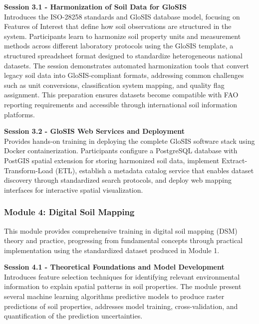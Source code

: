 \documentclass[
  10pt,
  b5paper,
  oneside]{book}
\begin{document}
\textbf{Session 3.1 - Harmonization of Soil Data for GloSIS}\\
Introduces the ISO-28258 standards and GloSIS database model, focusing on Features of Interest that define how soil observations are structured in the system. Participants learn to harmonize soil property units and measurement methods across different laboratory protocols using the GloSIS template, a structured spreadsheet format designed to standardize heterogeneous national datasets. The session demonstrates automated harmonization tools that convert legacy soil data into GloSIS-compliant formats, addressing common challenges such as unit conversions, classification system mapping, and quality flag assignment. This preparation ensures datasets become compatible with FAO reporting requirements and accessible through international soil information platforms.

\textbf{Session 3.2 - GloSIS Web Services and Deployment}\\
Provides hands-on training in deploying the complete GloSIS software stack using Docker containerization. Participants configure a PostgreSQL database with PostGIS spatial extension for storing harmonized soil data, implement Extract-Transform-Load (ETL), establish a metadata catalog service that enables dataset discovery through standardized search protocols, and deploy web mapping interfaces for interactive spatial visualization.

\subsubsection*{\texorpdfstring{\textbf{Module 4: Digital Soil Mapping}}{Module 4: Digital Soil Mapping}}\label{module-4-digital-soil-mapping}

This module provides comprehensive training in digital soil mapping (DSM) theory and practice, progressing from fundamental concepts through practical implementation using the standardized dataset produced in Module 1.

\textbf{Session 4.1 - Theoretical Foundations and Model Development}\\
Introduces feature selection techniques for identifying relevant environmental information to explain spatial patterns in soil properties. The module present several machine learning algorithms predictive models to produce raster predictions of soil properties, addresses model training, cross-validation, and quantification of the prediction uncertainties.
\end{document}
